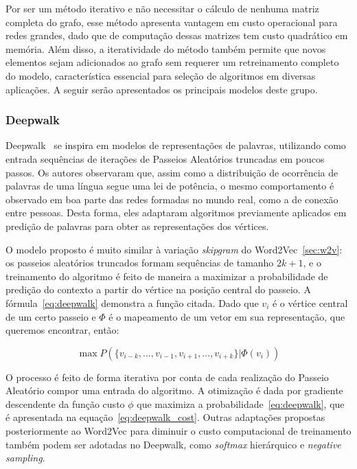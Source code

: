 Por ser um método iterativo e não necessitar o cálculo de nenhuma matriz completa
do grafo, esse método apresenta vantagem em custo operacional para redes
grandes, dado que de computação dessas matrizes tem custo quadrático em memória.
Além disso, a iteratividade do método também permite que novos elementos sejam
adicionados ao grafo sem requerer um retreinamento completo do modelo,
característica essencial para seleção de algoritmos em diversas aplicações.
A seguir serão apresentados os principais modelos deste grupo.

\subsubsection{Deepwalk}

Deepwalk~\cite{perozzi14} se inspira em modelos de representações de palavras,
utilizando como entrada sequências de iterações de Passeios Aleatórios truncadas
em poucos passos.
Os autores observaram que, assim como a distribuição de ocorrência de palavras de
uma língua segue uma lei de potência, o mesmo comportamento é observado em boa
parte das redes formadas no mundo real, como a de conexão entre pessoas.
Desta forma, eles adaptaram algoritmos previamente aplicados em predição de
palavras para obter as representações dos vértices.

O modelo proposto é muito similar à variação \textit{skipgram} do
Word2Vec~\ref{sec:w2v}: os passeios aleatórios truncados formam sequências de
tamanho $2k + 1$, e o treinamento do algoritmo é feito de maneira a maximizar a
probabilidade de predição do contexto a partir do vértice na posição central do
passeio.
A fórmula~\ref{eq:deepwalk} demonstra a função citada.
Dado que $v_i$ é o vértice central de um certo passeio e $\Phi$ é o mapeamento
de um vetor em sua representação, que queremos encontrar, então:

\begin{equation} \label{eq:deepwalk}
    \operatorname{max} P(\{v_{i-k},...,v_{i-1},v_{i+1},...,v_{i+k}\}|\Phi(v_i))
\end{equation}

O processo é feito de forma iterativa por conta de cada realização do Passeio
Aleatório compor uma entrada do algoritmo.
A otimização é dada por gradiente descendente da função custo $\phi$ que maximiza
a probabilidade~\ref{eq:deepwalk}, que é apresentada na
equação~\ref{eq:deepwalk_cost}.
Outras adaptações propostas posteriormente ao Word2Vec para diminuir o custo
computacional de treinamento também podem ser adotadas no Deepwalk, como
\textit{softmax} hierárquico e \textit{negative sampling}.


